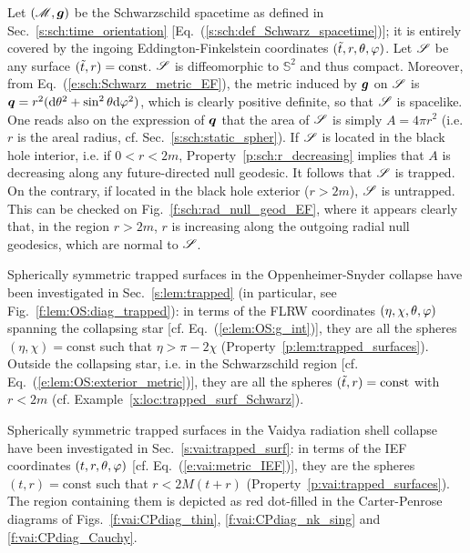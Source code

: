 \begin{example}
\label{x:loc:trapped_surf_Schwarz}
Let $(\mathscr{M},\bm{g})$ be the Schwarzschild spacetime as defined in Sec.~\ref{s:sch:time_orientation} [Eq.~(\ref{s:sch:def_Schwarz_spacetime})]; it is entirely covered by the ingoing Eddington-Finkelstein coordinates
$({\tilde t},r,\theta,\varphi)$. Let $\mathscr{S}$ be any surface $({\tilde t},r) = \mathrm{const}$.
$\mathscr{S}$ is diffeomorphic to $\mathbb{S}^2$ and thus compact.
Moreover, from Eq.~(\ref{e:sch:Schwarz_metric_EF}), the metric induced by $\bm{g}$
on $\mathscr{S}$ is $\bm{q} = r^2 (\mathrm{d}\theta^2 + \sin^2\theta\mathrm{d}\varphi^2)$, which is clearly positive definite, so
that $\mathscr{S}$ is spacelike. One reads also on the expression of $\bm{q}$
that the area of  $\mathscr{S}$ is simply $A = 4\pi r^2$ (i.e. $r$ is the areal radius, cf. Sec.~\ref{s:sch:static_spher}).
If $\mathscr{S}$ is located in the black hole interior, i.e. if $0<r < 2m$,
Property~\ref{p:sch:r_decreasing} implies that $A$ is decreasing along any future-directed null
geodesic. It follows that $\mathscr{S}$ is trapped. On the contrary, if located in the black hole exterior
($r> 2m$), $\mathscr{S}$ is untrapped. This can be checked on Fig.~\ref{f:sch:rad_null_geod_EF},
where it appears clearly that, in the region $r>2m$, $r$ is increasing along the outgoing radial null geodesics, which are normal to $\mathscr{S}$.
\end{example}

\begin{example}
Spherically symmetric trapped surfaces in the Oppenheimer-Snyder collapse
have been investigated in Sec.~\ref{s:lem:trapped} (in particular, see Fig.~\ref{f:lem:OS:diag_trapped}): in terms of the FLRW coordinates $(\eta,\chi,\theta,\varphi)$
spanning the collapsing star
[cf. Eq.~(\ref{e:lem:OS:g_int})], they are all the spheres $(\eta,\chi) = \mathrm{const}$
such that $\eta > \pi - 2 \chi$ (Property~\ref{p:lem:trapped_surfaces}). Outside
the collapsing star, i.e. in the Schwarzschild region [cf. Eq.~(\ref{e:lem:OS:exterior_metric})], they are all the spheres
$({\tilde t},r) = \mathrm{const}$ with $r< 2m$ (cf. Example~\ref{x:loc:trapped_surf_Schwarz}).
\end{example}

\begin{example}
Spherically symmetric trapped surfaces in the Vaidya radiation shell collapse
have been investigated in Sec.~\ref{s:vai:trapped_surf}: in terms of the
IEF coordinates $(t,r,\theta,\varphi)$ [cf. Eq.~(\ref{e:vai:metric_IEF})],
they are the spheres $(t,r) = \mathrm{const}$
such that $r < 2M(t+r)$ (Property~\ref{p:vai:trapped_surfaces}).
The region containing them is depicted as red dot-filled
in the Carter-Penrose diagrams of Figs.~\ref{f:vai:CPdiag_thin}, \ref{f:vai:CPdiag_nk_sing}
and \ref{f:vai:CPdiag_Cauchy}.
\end{example}


